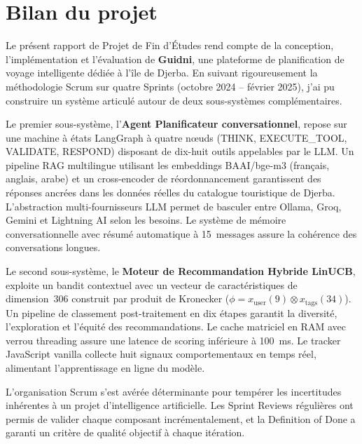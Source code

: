 
\section*{Bilan du projet}

Le présent rapport de Projet de Fin d'Études rend compte de la conception, l'implémentation
et l'évaluation de \textbf{Guidni}, une plateforme de planification de voyage intelligente
dédiée à l'île de Djerba. En suivant rigoureusement la méthodologie Scrum sur quatre Sprints
(octobre 2024 -- février 2025), j'ai pu construire un système articulé autour de deux
sous-systèmes complémentaires.

Le premier sous-système, l'\textbf{Agent Planificateur conversationnel}, repose sur une
machine à états LangGraph à quatre nœuds (THINK, EXECUTE\_TOOL, VALIDATE, RESPOND) disposant
de dix-huit outils appelables par le LLM. Un pipeline RAG multilingue utilisant les embeddings
BAAI/bge-m3 (français, anglais, arabe) et un cross-encoder de réordonnancement garantissent
des réponses ancrées dans les données réelles du catalogue touristique de Djerba. L'abstraction
multi-fournisseurs LLM permet de basculer entre Ollama, Groq, Gemini et Lightning AI selon
les besoins. Le système de mémoire conversationnelle avec résumé automatique à 15~messages
assure la cohérence des conversations longues.

Le second sous-système, le \textbf{Moteur de Recommandation Hybride LinUCB}, exploite un
bandit contextuel avec un vecteur de caractéristiques de dimension~306 construit par produit
de Kronecker ($\phi = x_{\text{user}}(9) \otimes x_{\text{tags}}(34)$). Un pipeline de
classement post-traitement en dix étapes garantit la diversité, l'exploration et l'équité
des recommandations. Le cache matriciel en RAM avec verrou threading assure une latence de
scoring inférieure à 100~ms. Le tracker JavaScript vanilla collecte huit signaux
comportementaux en temps réel, alimentant l'apprentissage en ligne du modèle.

L'organisation Scrum s'est avérée déterminante pour tempérer les incertitudes inhérentes à
un projet d'intelligence artificielle. Les Sprint Reviews régulières ont permis de valider
chaque composant incrémentalement, et la Definition of Done a garanti un critère de qualité
objectif à chaque itération.


